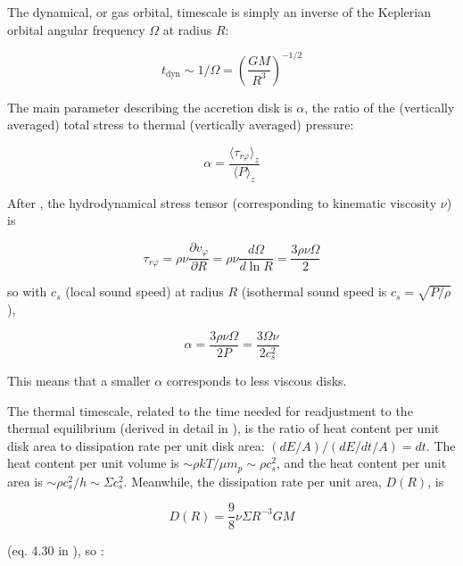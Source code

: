 \documentclass[twocolumn]{aastex62}
\begin{document}
The dynamical, or gas orbital, timescale is simply  an inverse of the Keplerian orbital angular frequency $ \Omega$  at radius $R$: 

\begin{equation}
t_{\mathrm{dyn}} {\sim}  1 / \Omega = \left( \frac{GM}{R^{3}}\right)^{-1/2}
\end{equation}


The main parameter  describing the accretion disk is $\alpha$, the ratio of the (vertically averaged) total stress to thermal (vertically averaged) pressure: 

\begin{equation}
\alpha= \frac{\langle \tau_{r\varphi}  \rangle_{z} }{\langle P \rangle _{z}} 
\end{equation}


After \cite{lasota2016},  the hydrodynamical stress tensor (corresponding to  kinematic viscosity $\nu$) is

\begin{equation}
\tau_{r\varphi } = \rho \nu \frac{\partial v_{\varphi}}{\partial R} = \rho \nu \frac{d \Omega}{d \ln{R}} = \frac{3 \rho \nu \Omega}{2}  
\end{equation}

so  with  $c_{s}$ (local sound speed) at radius $R$ (isothermal sound speed is $c_{s} = \sqrt{P/\rho}$),

\begin{equation}
\alpha  =   \frac{3 \rho \nu \Omega}{2 P} =  \frac{3 \Omega \nu}{2 c_{s}^{2}}
\end{equation}



This means that a smaller $\alpha$ corresponds to less viscous disks. 


The thermal timescale, related to the time needed for readjustment to the thermal equilibrium (derived in detail in \citealt{frank2002}), is the ratio of heat content per unit disk area to dissipation rate per unit disk area: $(dE / A) / (dE/dt /  A) = dt $.  The heat content per unit volume is ${\sim} \rho k T / \mu m_{p} {\sim} \rho c_{s}^{2}$, and the heat content per unit area is  ${\sim} \rho c_{s}^{2} / h {\sim} \Sigma c_{s}^{2}$. Meanwhile, the dissipation rate per unit area, $D(R)$, is 

\begin{equation}
D(R) = \frac{9}{8} \nu \Sigma R^{-3} G M
\end{equation}

(eq. 4.30 in \citealt{frank2002}), so :
\end{document}
